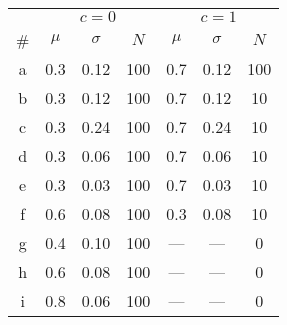 \begin{tabular}{ccccccc}
\toprule
 & \multicolumn{3}{c}{$c=0$} & \multicolumn{3}{c}{$c=1$} \\
\cmidrule(lr){2-4}\cmidrule(lr){5-7}
\# & $\mu$ & $\sigma$ & $N$ & $\mu$ & $\sigma$ & $N$ \\
\midrule
a & 0.3 & 0.12 & 100 & 0.7 & 0.12 & 100 \\
b & 0.3 & 0.12 & 100 & 0.7 & 0.12 & 10 \\
c & 0.3 & 0.24 & 100 & 0.7 & 0.24 & 10 \\
d & 0.3 & 0.06 & 100 & 0.7 & 0.06 & 10 \\
e & 0.3 & 0.03 & 100 & 0.7 & 0.03 & 10 \\
f & 0.6 & 0.08 & 100 & 0.3 & 0.08 & 10 \\
g & 0.4 & 0.10 & 100 & --- & --- & 0 \\
h & 0.6 & 0.08 & 100 & --- & --- & 0 \\
i & 0.8 & 0.06 & 100 & --- & --- & 0 \\
\bottomrule
\end{tabular}